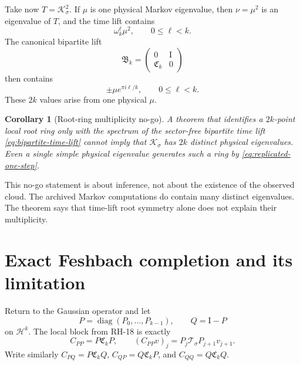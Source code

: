 \documentclass[11pt]{article}
\newtheorem{corollary}[theorem]{Corollary}
\theoremstyle{definition}
\theoremstyle{remark}
\newcommand{\Id}{\mathrm I}
\newcommand{\cK}{\mathcal K}
\newcommand{\cT}{\mathcal T}
\newcommand{\cH}{\mathcal H}
\begin{document}
Take now $T=\cK_\sigma^2$.  If $\mu$ is one physical Markov eigenvalue,
then $\nu=\mu^2$ is an eigenvalue of $T$, and the time lift contains
\begin{equation}\label{eq:replicated-two-step}
 \omega_k^\ell\mu^2,
 \qquad 0\le\ell<k.
\end{equation}
The canonical bipartite lift
\begin{equation}\label{eq:bipartite-time-lift}
 \mathfrak B_k=
 \begin{pmatrix}0&\Id\\ \mathfrak C_k&0\end{pmatrix}
\end{equation}
then contains
\begin{equation}\label{eq:replicated-one-step}
 \pm\mu e^{\pi i\ell/k},
 \qquad0\le\ell<k.
\end{equation}
These $2k$ values arise from one physical $\mu$.

\begin{corollary}[Root-ring multiplicity no-go]
\label{cor:multiplicity-no-go}
A theorem that identifies a $2k$-point local root ring only with the spectrum
of the sector-free bipartite time lift \eqref{eq:bipartite-time-lift} cannot
imply that $\cK_\sigma$ has $2k$ distinct physical eigenvalues.  Even a single
simple physical eigenvalue generates such a ring by
\eqref{eq:replicated-one-step}.
\end{corollary}

This no-go statement is about inference, not about the existence of the
observed cloud.  The archived Markov computations do contain many distinct
eigenvalues.  The theorem says that time-lift root symmetry alone does not
explain their multiplicity.

\section{Exact Feshbach completion and its limitation}
\label{sec:feshbach}

Return to the Gaussian operator and let
\begin{equation}\label{eq:time-projection}
 P=\operatorname{diag}(P_0,\ldots,P_{k-1}),
 \qquad Q=\Id-P
\end{equation}
on $\cH^k$.  The local block from RH-18 is exactly
\begin{equation}\label{eq:local-time-block}
 C_{PP}=P\mathfrak C_kP,
 \qquad
 (C_{PP}v)_j=P_j\cT_\sigma P_{j+1}v_{j+1}.
\end{equation}
Write similarly $C_{PQ}=P\mathfrak C_kQ$, $C_{QP}=Q\mathfrak C_kP$, and
$C_{QQ}=Q\mathfrak C_kQ$.
\end{document}
